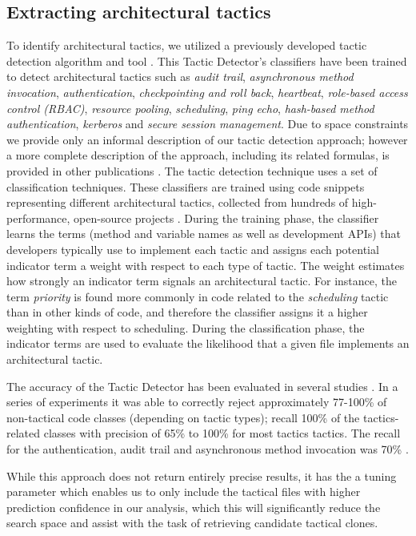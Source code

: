 \subsection{Extracting architectural tactics}

To identify architectural tactics, we utilized a previously developed tactic detection algorithm and tool \cite{ICSE2012, FSE2014}. This Tactic Detector's classifiers have been trained to detect architectural tactics such as \textit{audit trail}, \textit{asynchronous method invocation}, \textit{authentication}, \textit{checkpointing and roll back}, \textit{heartbeat}, \textit{role-based access control (RBAC)}, \textit{resource pooling}, \textit{scheduling}, \textit{ping echo}, \textit{hash-based method authentication}, \textit{kerberos} and \textit{secure session management}.
Due to space constraints we provide only an informal description of our tactic detection approach; however a more complete description of the approach, including its related formulas, is provided in other publications \cite{Dissertation, ICSE2012}.  The tactic detection technique uses a set of classification techniques. These classifiers are trained using code snippets representing different architectural tactics, collected from hundreds of high-performance, open-source projects \cite{FSE2012,ICSE2012,Dissertation}.  During the training phase, the classifier learns the terms (method and variable names as well as development APIs) that developers typically use to implement each  tactic and assigns each potential indicator term a weight with respect to each type of  tactic. The weight estimates how strongly an indicator term signals an architectural tactic. For instance, the term \emph{priority} is found more commonly in code related to the \emph{scheduling} tactic than in other kinds of code, and therefore the classifier assigns it a higher weighting with respect to scheduling. During the classification phase, the indicator terms are used to evaluate the likelihood that a given file implements an architectural tactic.

The accuracy of the Tactic Detector has been evaluated in several studies \cite{ICSE2012,FSE2014,Dissertation}. In a series of  experiments it was able to correctly reject approximately 77-100\% of non-tactical code classes (depending on tactic types); recall 100\% of the tactics-related classes with precision of 65\% to 100\% for most tactics tactics.  The recall for the authentication, audit trail and asynchronous method invocation was 70\% .

While this approach does not return entirely precise results, it has the a tuning parameter which enables us to only include the tactical files with higher prediction confidence in our analysis, which this will significantly reduce the search space and assist with the task of retrieving candidate tactical clones.



